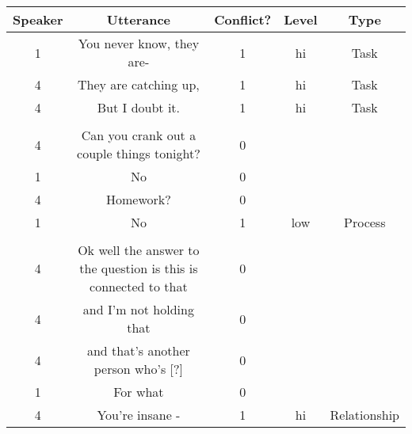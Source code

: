 \begin{tabular}{c|c|c|c|c}
Speaker&Utterance&Conflict?&Level&Type\\\hline
1&You never know, they are-&1&hi&Task\\
4&They are catching up, &1&hi&Task\\
4&But I doubt it.&1&hi&Task\\\hline
&&&&\\\hline
4&Can you crank out a couple things tonight?&0&&\\
1&No&0&&\\
4&Homework?&0&&\\
1&No&1&low&Process\\\hline
&&&&\\\hline
4&Ok well the answer to the question is this is connected to that  &0&&\\
4&and I'm not holding that&0&&\\
4&and that's another person who's [?]&0&&\\
1&For what&0&&\\
4&You're insane - &1&hi&Relationship\\
\end{tabular}